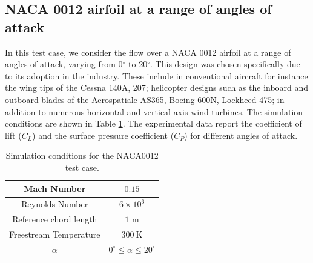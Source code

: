 
\subsection{NACA 0012 airfoil at a range of angles of attack} \label{sec:equips_naca0012}
In this test case, we consider the flow over a NACA 0012 airfoil at a range of angles of attack, varying from 0$^{\circ}$ to 20$^{\circ}$. This design was chosen specifically due to its adoption in the industry. These include in conventional aircraft for instance the wing tips of the Cessna 140A, 207; helicopter designs such as the inboard and outboard blades of the Aerospatiale AS365, Boeing 600N, Lockheed 475; in addition to numerous horizontal and vertical axis wind turbines. The simulation conditions are shown in Table \ref{tab:naca0012_cond}. The experimental data \cite{ladson1988} report the coefficient of lift ($C_L$) and the surface pressure coefficient ($C_P$) for different angles of attack. 

\begin{table}
\centering
    \renewcommand{\arraystretch}{1.2}
    \captionsetup{justification=centering}
    \caption{Simulation conditions for the NACA0012 test case.} 
    \begin{tabular}{|c|c|}
        \hline
        Mach Number & $0.15$ \\ \hline
        Reynolds Number & $6\times10^6$ \\ \hline
        Reference chord length & $1$ m \\ \hline
        Freestream Temperature & $300~\text{K}$ \\ \hline
        $\alpha$ & $0^\circ \leq \alpha \leq 20^\circ$ \\ \hline 
    \end{tabular}
    \label{tab:naca0012_cond}
\end{table}

